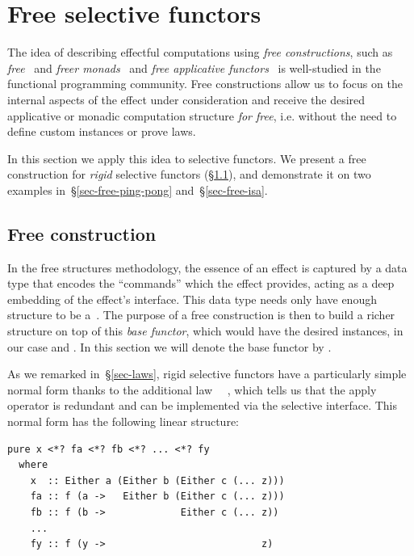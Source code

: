 \section{Free selective functors}\label{sec-free}

The idea of describing effectful computations using \emph{free constructions},
such as \emph{free}~\cite{swierstra2008data} and \emph{freer
monads}~\cite{kiselyov2015freer} and \emph{free applicative
functors}~\cite{free-applicatives} is well-studied in the functional programming
community. Free constructions allow us to focus on the internal aspects of the
effect under consideration and receive the desired applicative or monadic
computation structure \emph{for free}, i.e. without the need to define custom
instances or prove laws.

In this section we apply this idea to selective functors. We present a free
construction for \emph{rigid} selective functors
(\S\ref{sec-free-construction}), and demonstrate it on two examples
in~\S\ref{sec-free-ping-pong} and~\S\ref{sec-free-isa}.

\subsection{Free construction}\label{sec-free-construction}

In the free structures methodology, the essence of an effect is captured by a
data type that encodes the ``commands'' which the effect provides, acting as a
deep embedding of the effect's interface. This data type needs only have enough
structure to be a~. The purpose of a free construction is then to
build a richer structure on top of this \emph{base functor}, which would have
the desired instances, in our case  and . In this
section we will denote the base functor by .

As we remarked in~\S\ref{sec-laws}, rigid selective functors have a particularly
simple normal form thanks to the additional law \hs{(<*>)}~\hs{=}~,
which tells us that the apply operator \hs{<*>} is redundant and can be
implemented via the selective interface. This normal form has the following
linear structure:

\begin{verbatim}
pure x <*? fa <*? fb <*? ... <*? fy
  where
    x  :: Either a (Either b (Either c (... z)))
    fa :: f (a ->   Either b (Either c (... z)))
    fb :: f (b ->             Either c (... z))
    ...
    fy :: f (y ->                           z)
\end{verbatim}

